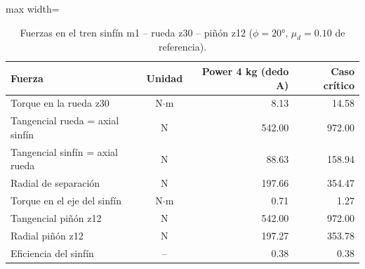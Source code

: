 \begin{table}[H]
\centering

\begin{adjustbox}{max width=\textwidth}
\begin{tabular}{|l|c|r|r|}
\hline
\textbf{Fuerza} & \textbf{Unidad} & \textbf{Power 4 kg (dedo A)} & \textbf{Caso crítico} \\ \hline
Torque en la rueda z30 & N$\cdot$m & 8.13 & 14.58 \\ \hline
Tangencial rueda = axial sinfín & N & 542.00 & 972.00 \\ \hline
Tangencial sinfín = axial rueda & N & 88.63 & 158.94 \\ \hline
Radial de separación & N & 197.66 & 354.47 \\ \hline
Torque en el eje del sinfín & N$\cdot$m & 0.71 & 1.27 \\ \hline
Tangencial piñón z12 & N & 542.00 & 972.00 \\ \hline
Radial piñón z12 & N & 197.27 & 353.78 \\ \hline
Eficiencia del sinfín & -- & 0.38 & 0.38 \\ \hline
\end{tabular}
\end{adjustbox}
\caption{Fuerzas en el tren sinfín m1 -- rueda z30 -- piñón z12 ($\phi = 20°$, $\mu_d = 0.10$ de referencia).}
\label{tab:engranes}
\end{table}